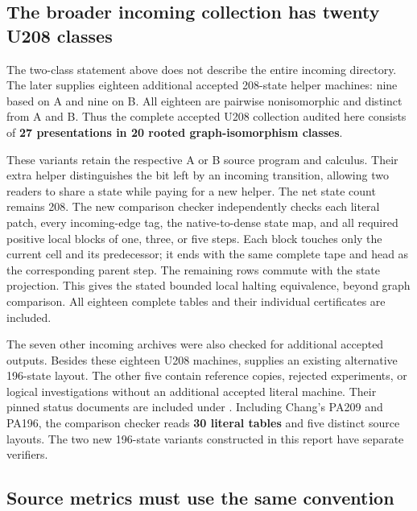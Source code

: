 \subsection{The broader incoming collection has twenty U208 classes}

The two-class statement above does not describe the entire incoming
directory. The later  supplies eighteen
additional accepted 208-state helper machines: nine based on A and nine
on B. All eighteen are pairwise nonisomorphic and distinct from A and B.
Thus the complete accepted U208 collection audited here consists of
\textbf{27 presentations in 20 rooted graph-isomorphism classes}.

These variants retain the respective A or B source program and calculus.
Their extra helper distinguishes the bit left by an incoming transition,
allowing two readers to share a state while paying for a new helper. The
net state count remains 208. The new comparison checker independently
checks each literal patch, every incoming-edge tag, the native-to-dense
state map, and all required positive local blocks of one, three, or five
steps. Each block touches only the current cell and its predecessor;
it ends with the same complete tape and head as the corresponding parent
step. The remaining rows commute with the state projection. This gives
the stated bounded local halting equivalence, beyond graph comparison.
All eighteen complete tables and their individual certificates are included.

The seven other incoming archives were also checked for additional
accepted outputs. Besides these eighteen U208 machines,
 supplies an existing alternative
196-state layout. The other five contain reference copies, rejected
experiments, or logical investigations without an additional accepted
literal machine. Their pinned status documents are included under
. Including Chang's PA209 and PA196,
the comparison checker reads \textbf{30 literal tables} and five
distinct source layouts. The two new 196-state variants constructed in
this report have separate verifiers.

\subsection{Source metrics must use the same convention}

